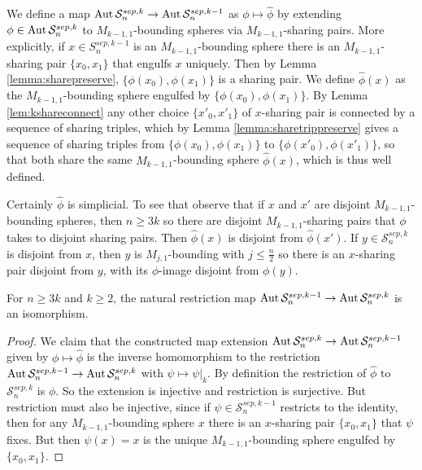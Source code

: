 We define a map $\operatorname{Aut}  \mathcal S^{sep,k}_n \to \operatorname{Aut}  \mathcal S^{sep,k-1}_n$
as $\phi \mapsto \hat \phi$ by extending $\phi \in \operatorname{Aut}  \mathcal S^{sep,k}_n$
to $M_{k-1,1}$-bounding spheres via $M_{k-1,1}$-sharing pairs.
More explicitly,
if $x \in S^{sep,k-1}_n$
is an $M_{k-1,1}$-bounding sphere
there is an $M_{k-1,1}$-sharing pair $\{x_0,x_1\}$
that engulfs $x$ uniquely.
Then by Lemma \ref{lemma:sharepreserve},
$\{\phi(x_0),\phi(x_1)\}$
is a sharing pair.
We define $\hat \phi (x)$ as
the $M_{k-1,1}$-bounding sphere
engulfed by $\{\phi(x_0),\phi(x_1)\}$.
By Lemma \ref{lem:kshareconnect}
any other choice $\{x'_0,x'_1\}$
of $x$-sharing pair is connected by
a sequence of sharing triples,
which by Lemma \ref{lemma:sharetrippreserve}
gives a sequence of sharing triples from
$\{\phi(x_0),\phi(x_1)\}$ to $\{\phi(x'_0), \phi(x'_1)\}$,
so that both share the same $M_{k-1,1}$-bounding sphere $\hat \phi(x)$,
which is thus well defined.

Certainly $\hat \phi$ is simplicial.
To see that observe that
if $x$ and $x'$ are disjoint
$M_{k-1,1}$-bounding spheres,
then $n \geq 3k$ so there are disjoint
$M_{k-1,1}$-sharing pairs
that $\phi$ takes to disjoint sharing pairs.
Then $\hat \phi(x)$ is disjoint from $\hat \phi(x')$.
If $y\in \mathcal S^{sep,k}_n$ is disjoint from $x$,
then $y$ is $M_{j,1}$-bounding with $j \leq \frac n 2$
so there is an $x$-sharing pair disjoint from $y$,
with its $\phi$-image disjoint from $\phi(y)$.


\begin{lemma}
  For  $n\geq 3k$ and $k\geq 2$,
  the natural restriction map
   $\operatorname{Aut}  \mathcal S^{sep,k-1}_n \to \operatorname{Aut}  \mathcal S^{sep,k}_n$
   is an isomorphism.
   \label{lemma:highsepinduct}
\end{lemma}

\begin{proof}
 We claim that the constructed map
 extension $ \operatorname{Aut}  \mathcal S^{sep,k}_n \to \operatorname{Aut}  \mathcal S^{sep,k-1}_n $
 given by $\phi \mapsto \hat \phi$
 is the inverse homomorphism to the restriction
 $ \operatorname{Aut}  \mathcal S^{sep,k-1}_n \to \operatorname{Aut}  \mathcal S^{sep,k}_n $
 with
 $\psi \mapsto \psi|_{k}$.
 By definition the restriction of $\hat \phi$ to $\mathcal S^{sep,k}_n $
 is  $\phi$.
 So the extension is injective and restriction is surjective.
 But restriction must also be injective,
 since if $\psi \in \mathcal S^{sep,k-1}_n$
 restricts to the identity,
 then for any $M_{k-1,1}$-bounding sphere $x$
 there is an $x$-sharing pair $\{x_0,x_1\}$ that $\psi$ fixes.
 But then $\psi(x)=x$ is the unique  $M_{k-1,1}$-bounding sphere
 engulfed by $\{x_0,x_1\}$.
\end{proof}


